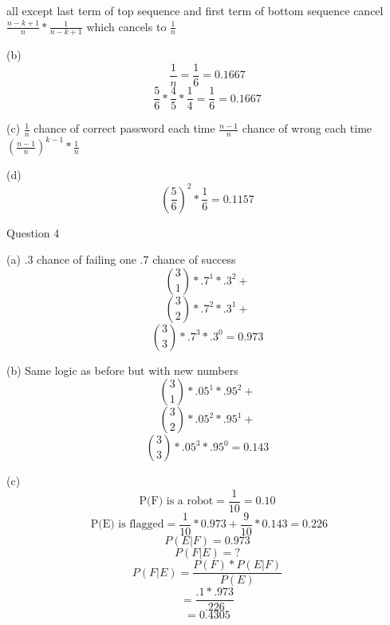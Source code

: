 \documentclass[12pt]{article}
\begin{document}
\begin{flushleft}
	all except last term of top sequence and first term of bottom sequence cancel
	$\frac{n-k+1}{n}*\frac{1}{n-k+1}$ which cancels to \newline
	$\frac{1}{n}$
	
	(b)
	\[ \frac{1}{n} = \frac{1}{6} = 0.1667 \]
	\[ \frac{5}{6}*\frac{4}{5}*\frac{1}{4} = \frac{1}{6} = 0.1667 \]
	
	(c)
	$\frac{1}{n}$ chance of correct password each time  \newline
	$\frac{n-1}{n}$ chance of wrong each time \newline
	$\left(\frac{n-1}{n}\right)^{k-1}*\frac{1}{n}$
	
	(d)
		\[ \left(\frac{5}{6}\right)^2*\frac{1}{6} = 0.1157 \]
		
Question 4

	(a)
	.3 chance of failing one \newline
	.7 chance of success \newline
	\[ \binom{3}{1}*.7^1*.3^2 + \]
	\[ \binom{3}{2}*.7^2*.3^1 + \]
	\[ \binom{3}{3}*.7^3*.3^0 = 0.973 \]
	
	(b) Same logic as before but with new numbers
	\[ \binom{3}{1}*.05^1*.95^2 + \] 
	\[ \binom{3}{2}*.05^2*.95^1 + \]
	\[ \binom{3}{3}*.05^3*.95^0 = 0.143 \]
	
	(c) \[ \text{P(F) is a robot} = \frac{1}{10} = 0.10 \]
		\[\text{ P(E) is flagged} = \frac{1}{10}*0.973 + \frac{9}{10}*0.143 = 0.226 \]
		\[ P(E \vert F) = 0.973 \]
		\[ P(F \vert E) = ? \]
		\[P(F \vert E) = \frac{P(F)*P(E \vert F)}{P(E)} \]
				\[ = \frac{.1*.973}{.226} \]
				\[ = 0.4305 \]
		
		
		
\end{flushleft}
\end{document}
